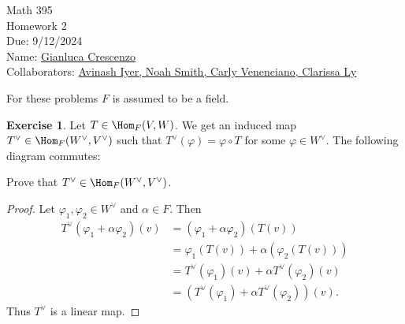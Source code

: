 \documentclass[9pt,twoside,openany]{memoir}
\theoremstyle{plain}
\theoremstyle{definition}
\newtheorem{exercise}{Exercise}
\theoremstyle{remark}
\numberwithin{equation}{section}
\begin{document}
\begin{center}
    { \Large Math 395 \\[0.1in]Homework 2 \\[0.1in]
    Due: 9/12/2024}\\[.25in]
    { Name:} {\underline{Gianluca Crescenzo\hspace*{2in}}}\\[0.15in]
    { Collaborators:} {\underline{ Avinash Iyer, Noah Smith, Carly Venenciano, Clarissa Ly \hspace*{1in}}} \\
    \end{center}
    For these problems $F$ is assumed to be a field.
    \vspace{4pt}
    \begin{exercise}
        Let $T \in \Hom_F{(V,W)}$. We get an induced map $T^\vee \in \Hom_F{(W^\vee , V^\vee)}$ such that $T^\vee(\varphi) = \varphi \circ T$ for some $\varphi \in W^\vee$. The following diagram commutes:
                \begin{center}
                \end{center}
            Prove that $T^\vee \in \Hom_F{(W^\vee,V^\vee)}$.
            
    \end{exercise}
        \begin{proof}
            Let $\varphi_1,\varphi_2 \in W^\vee$ and $\alpha \in F$. Then 
                \begin{equation*}
                \begin{split}
                    T^\vee(\varphi_1 + \alpha \varphi_2)(v)
                    & = (\varphi_1 + \alpha \varphi_2)(T(v)) \\
                    & = \varphi_1(T(v)) + \alpha (\varphi_2(T(v)))\\
                    & = T^\vee(\varphi_1)(v) + \alpha T^\vee(\varphi_2)(v) \\
                    & = (T^\vee(\varphi_1) + \alpha T^\vee(\varphi_2))(v).
                \end{split}
                \end{equation*}
            Thus $T^\vee$ is a linear map.
        \end{proof}
\end{document}
